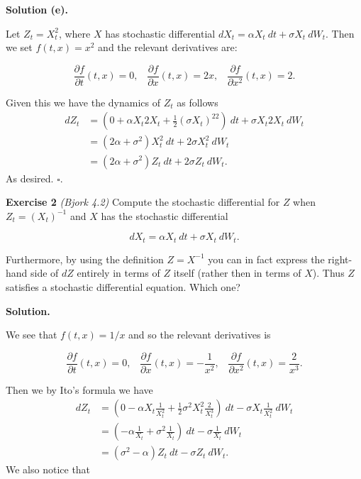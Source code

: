 \documentclass[a4paper,12pt,openany]{book}
\begin{document}
\textbf{Solution (e).}

Let \(Z_t=X_t^2\), where \(X\) has stochastic differential \(dX_t=\alpha X_t\ dt+\sigma X_t\ dW_t\). Then we set \(f(t,x)=x^2\) and the relevant derivatives are:

\[
\frac{\partial f}{\partial t}(t,x)=0,\hspace{10pt}\frac{\partial f}{\partial x}(t,x) =2x,\hspace{10pt}\frac{\partial f}{\partial x^2}(t,x) =2.
\]

Given this we have the dynamics of \(Z_t\) as follows
\begin{align*}
dZ_t&=\left(0 + \alpha X_t2X_t+\frac{1}{2}(\sigma X_t)^22\right)\ dt+\sigma X_t 2 X_t\ dW_t\\
&=\left(2\alpha +\sigma^2\right) X_t^2\ dt + 2\sigma X_t^2\ dW_t\\
&=\left(2\alpha +\sigma^2\right) Z_t\ dt + 2\sigma Z_t\ dW_t.
\end{align*}
As desired. \(\square\).

\textbf{Exercise 2} \emph{(Bjork 4.2)} Compute the stochastic differential for \(Z\) when \(Z_t=(X_t)^{-1}\) and \(X\) has the stochastic differential

\[
dX_t=\alpha X_t\ dt + \sigma X_t\ dW_t.
\]

Furthermore, by using the definition \(Z=X^{-1}\) you can in fact express the right-hand side of \(dZ\) entirely in terms of \(Z\) itself (rather then in terms of \(X\)). Thus \(Z\) satisfies a stochastic differential equation. Which one?

\textbf{Solution.}

We see that \(f(t,x)=1/x\) and so the relevant derivatives is

\[
\frac{\partial f}{\partial t}(t,x)=0,\hspace{10pt}\frac{\partial f}{\partial x}(t,x) =-\frac{1}{x^2},\hspace{10pt}\frac{\partial f}{\partial x^2}(t,x) =\frac{2}{x^3}.
\]

Then we by Ito's formula we have
\begin{align*}
dZ_t&=\left(0-\alpha X_t\frac{1}{X_t^2}+\frac{1}{2} \sigma^2 X_t^2\frac{2}{X_t^3}\right)\ dt-\sigma X_t\frac{1}{X_t^2}\ dW_t\\
&=\left(-\alpha \frac{1}{X_t}+ \sigma^2 \frac{1}{X_t}\right)\ dt-\sigma \frac{1}{X_t}\ dW_t\\
&=(\sigma^2-\alpha)Z_t\ dt-\sigma Z_t\ dW_t.
\end{align*}
We also notice that
\end{document}
